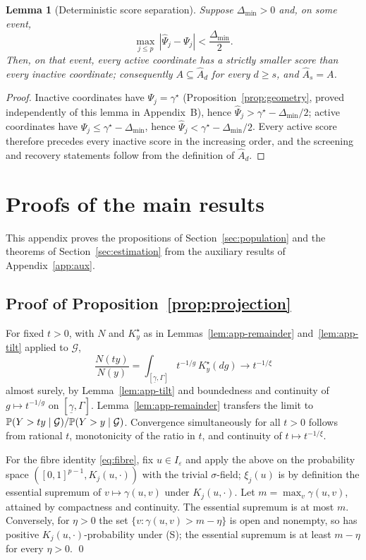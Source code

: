 \documentclass[bj,authoryear]{imsart}
\theoremstyle{plain}
\newtheorem{lemma}[theorem]{Lemma}
\newcommand{\A}{A}\newcommand{\I}{I_\varepsilon}
\newcommand{\gmax}{\gamma^\star}
\begin{document}
\begin{appendix}
\begin{lemma}[Deterministic score separation]\label{lem:app-separation}
Suppose $\Delta_{\min}>0$ and, on some event,
\[
 \max_{j\le p}\,|\widehat\Psi_j-\Psi_j|<\frac{\Delta_{\min}}{2}.
\]
Then, on that event, every active coordinate has a strictly smaller
score than every inactive coordinate; consequently
$\A\subseteq\widehat\A_d$ for every $d\ge s$, and
$\widehat\A_s=\A$.
\end{lemma}

\begin{proof}
Inactive coordinates have $\Psi_j=\gmax$
(Proposition~\ref{prop:geometry}, proved independently of this lemma
in Appendix~B), hence
$\widehat\Psi_j>\gmax-\Delta_{\min}/2$; active coordinates have
$\Psi_j\le\gmax-\Delta_{\min}$, hence
$\widehat\Psi_j<\gmax-\Delta_{\min}/2$.  Every active score therefore
precedes every inactive score in the increasing order, and the screening
and recovery statements follow from the definition of
$\widehat\A_d$.
\end{proof}

\section{Proofs of the main results}
\label{app:proofs}
\renewcommand{\theequation}{B.\arabic{equation}}
\setcounter{equation}{0}

This appendix proves the propositions of Section~\ref{sec:population}
and the theorems of Section~\ref{sec:estimation} from the auxiliary
results of Appendix~\ref{app:aux}.

\subsection{Proof of Proposition~\ref{prop:projection}}

For fixed $t>0$, with $N$ and $K_y^\star$ as in
Lemmas~\ref{lem:app-remainder} and~\ref{lem:app-tilt} applied to
$\mathcal G$,
\[
 \frac{N(ty)}{N(y)}
 =\int_{[\underline\gamma,\Gamma]}t^{-1/g}\,K_y^\star(dg)
 \longrightarrow t^{-1/\xi}
\]
almost surely, by Lemma~\ref{lem:app-tilt} and boundedness and
continuity of $g\mapsto t^{-1/g}$ on $[\underline\gamma,\Gamma]$.
Lemma~\ref{lem:app-remainder} transfers the limit to
$\mathbb P(Y>ty\mid\mathcal G)/\mathbb P(Y>y\mid\mathcal G)$.  Convergence
simultaneously for all $t>0$ follows from rational $t$, monotonicity of
the ratio in $t$, and continuity of $t\mapsto t^{-1/\xi}$.

For the fibre identity \eqref{eq:fibre}, fix $u\in\I$ and apply the above
on the probability space $([0,1]^{p-1},K_j(u,\cdot))$ with the trivial
$\sigma$-field; $\xi_j(u)$ is by definition the essential supremum of
$v\mapsto\gamma(u,v)$ under $K_j(u,\cdot)$.  Let
$m=\max_v\gamma(u,v)$, attained by compactness and continuity.  The
essential supremum is at most $m$.  Conversely, for $\eta>0$ the set
$\{v:\gamma(u,v)>m-\eta\}$ is open and nonempty, so has positive
$K_j(u,\cdot)$-probability under (S); the essential supremum is at least
$m-\eta$ for every $\eta>0$.  \qed


\end{appendix}
\end{document}
